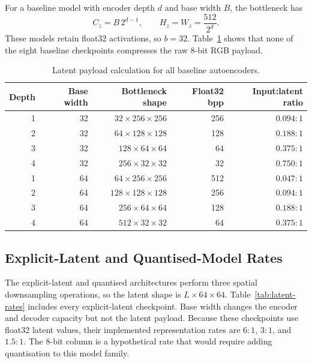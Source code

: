 \documentclass[10pt,a4paper]{article}
\begin{document}
For a baseline model with encoder depth \(d\) and base width \(B\), the
bottleneck has
\begin{equation}
    C_z=B\,2^{d-1},\qquad H_z=W_z=\frac{512}{2^d}.
\end{equation}
These models retain float32 activations, so \(b=32\). Table~\ref{tab:legacy-rates}
shows that none of the eight baseline checkpoints compresses the raw 8-bit
RGB payload.

\begin{table}[ht]
\centering
\small
\caption{Latent payload calculation for all baseline autoencoders.}
\begin{tabular}{rrrrr}
\toprule
Depth & Base width & Bottleneck shape & Float32 bpp & Input:latent ratio \\
\midrule
1 & 32 & \(32\times256\times256\) & 256 & \(0.094{:}1\) \\
2 & 32 & \(64\times128\times128\) & 128 & \(0.188{:}1\) \\
3 & 32 & \(128\times64\times64\)  & 64  & \(0.375{:}1\) \\
4 & 32 & \(256\times32\times32\)  & 32  & \(0.750{:}1\) \\
1 & 64 & \(64\times256\times256\) & 512 & \(0.047{:}1\) \\
2 & 64 & \(128\times128\times128\)& 256 & \(0.094{:}1\) \\
3 & 64 & \(256\times64\times64\)  & 128 & \(0.188{:}1\) \\
4 & 64 & \(512\times32\times32\)  & 64  & \(0.375{:}1\) \\
\bottomrule
\end{tabular}
\label{tab:legacy-rates}
\end{table}

\subsection{Explicit-Latent and Quantised-Model Rates}

The explicit-latent and quantised architectures perform three spatial
downsampling operations, so the latent shape is \(L\times64\times64\).
Table~\ref{tab:latent-rates} includes every explicit-latent checkpoint. Base
width changes the encoder and decoder capacity but not the latent payload.
Because these checkpoints use float32 latent values, their implemented
representation rates are \(6{:}1\), \(3{:}1\), and \(1.5{:}1\). The 8-bit
column is a hypothetical rate that would require adding quantisation to this
model family.
\end{document}
